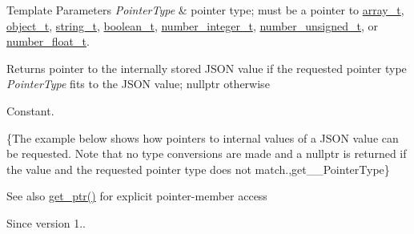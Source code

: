 \begin{DoxyTemplParams}{Template Parameters}
{\em Pointer\+Type} & pointer type; must be a pointer to \hyperlink{classnlohmann_1_1basic__json_a4c409f1b6d9caf3412c78af9a5883fed}{array\+\_\+t}, \hyperlink{classnlohmann_1_1basic__json_a0322396ca5cd4623bc816bf735377623}{object\+\_\+t}, \hyperlink{classnlohmann_1_1basic__json_a61f8566a1a85a424c7266fb531dca005}{string\+\_\+t}, \hyperlink{classnlohmann_1_1basic__json_a4c919102a9b4fe0d588af64801436082}{boolean\+\_\+t}, \hyperlink{classnlohmann_1_1basic__json_a98e611d67b7bd75307de99c9358ab2dc}{number\+\_\+integer\+\_\+t}, \hyperlink{classnlohmann_1_1basic__json_ab906e29b5d83ac162e823ada2156b989}{number\+\_\+unsigned\+\_\+t}, or \hyperlink{classnlohmann_1_1basic__json_a88d6103cb3620410b35200ee8e313d97}{number\+\_\+float\+\_\+t}.\\
\hline
\end{DoxyTemplParams}
\begin{DoxyReturn}{Returns}
pointer to the internally stored J\+S\+ON value if the requested pointer type {\itshape Pointer\+Type} fits to the J\+S\+ON value; {\ttfamily nullptr} otherwise
\end{DoxyReturn}
Constant.

\{The example below shows how pointers to internal values of a J\+S\+ON value can be requested. Note that no type conversions are made and a {\ttfamily nullptr} is returned if the value and the requested pointer type does not match.,get\+\_\+\+\_\+\+Pointer\+Type\}

\begin{DoxySeeAlso}{See also}
\hyperlink{classnlohmann_1_1basic__json_aa263420f5d1e68b05d25a83a457725a0}{get\+\_\+ptr()} for explicit pointer-\/member access
\end{DoxySeeAlso}
\begin{DoxySince}{Since}
version 1.. 
\end{DoxySince}
